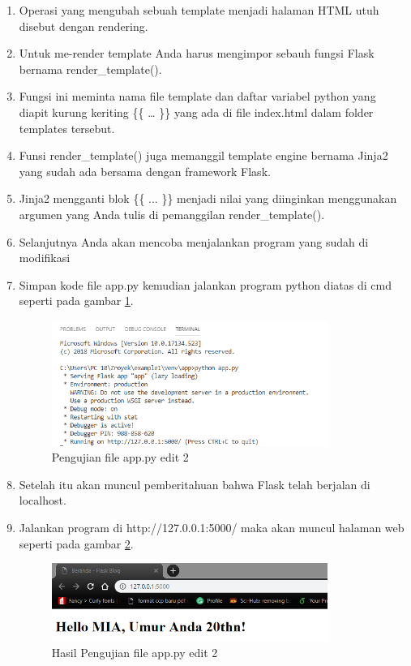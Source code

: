 \begin{enumerate}
\item Operasi yang mengubah sebuah template menjadi halaman HTML utuh disebut dengan rendering. 
\item Untuk me-render template  Anda harus mengimpor sebauh fungsi Flask bernama render\_template(). 
\item Fungsi ini meminta nama file template dan daftar variabel python yang diapit kurung keriting \{\{ … \}\} yang ada di  file index.html dalam folder templates tersebut.
\item Funsi render\_template() juga memanggil template engine bernama Jinja2 yang sudah ada bersama dengan framework Flask. 
\item Jinja2 mengganti blok \{\{ ... \}\} menjadi nilai yang diinginkan menggunakan argumen yang  Anda tulis di pemanggilan render\_template().
\item Selanjutnya  Anda akan mencoba menjalankan program yang sudah di modifikasi
\item Simpan kode file app.py kemudian jalankan program python diatas di cmd seperti pada gambar \ref{fig:ufa}.
\begin{figure}[!htbp]
	\centerline{\includegraphics[width=0.85\textwidth]{figures/13/ufa.PNG}}
	\caption{Pengujian file app.py edit 2}
	\label{fig:ufa}
\end{figure}

\item Setelah itu akan muncul pemberitahuan bahwa Flask telah berjalan di localhost.
\item Jalankan program di http://127.0.0.1:5000/ maka akan muncul halaman web seperti pada gambar \ref{fig:hufa2}.
\begin{figure}[!htbp]
	\centerline{\includegraphics[width=0.85\textwidth]{figures/13/hufa2.PNG}}
	\caption{Hasil Pengujian file app.py edit 2}
	\label{fig:hufa2}
\end{figure}


\end{enumerate}
